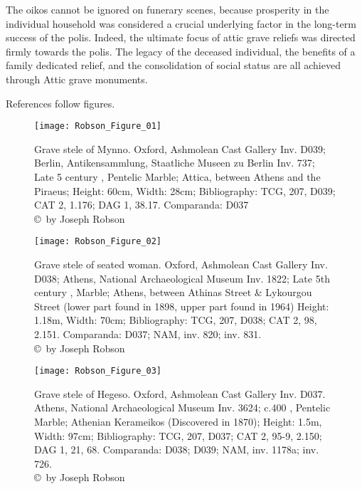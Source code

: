 The oikos cannot be ignored on funerary scenes, because prosperity in the individual household was considered a crucial underlying factor in the long-term success of the polis. Indeed, the ultimate focus of attic grave reliefs was directed firmly towards the polis. The legacy of the deceased individual, the benefits of a family dedicated relief, and the consolidation of social status are all achieved through Attic grave monuments.


\IJSRAseparator
\clearpage
{}

References follow figures.

\begin{figure}[!b]
	\texttt{[image: Robson\_Figure\_01]}

	\caption{Grave stele of Mynno. Oxford, Ashmolean Cast Gallery Inv. D039; Berlin, Antikensammlung, Staatliche Museen zu Berlin Inv. 737; Late 5 century \BC, Pentelic Marble; Attica, between Athens and the Piraeus; Height: 60cm, Width: 28cm; Bibliography: TCG, 207, D039; CAT 2, 1.176; DAG 1, 38.17. Comparanda: D037
		{\normalfont\scriptsize \\ \copyright\ by Joseph Robson}}
	\label{fig:Robson_Figure_01}
\end{figure}
\clearpage
\begin{figure}[!p]
	\texttt{[image: Robson\_Figure\_02]}

	\caption{Grave stele of seated woman. Oxford, Ashmolean Cast Gallery Inv. D038; Athens, National Archaeological Museum Inv. 1822; Late 5th century \BC, Marble; Athens, between Athinas Street \& Lykourgou Street (lower part found in 1898, upper part found in 1964)
		Height: 1.18m, Width: 70cm; Bibliography: TCG, 207, D038; CAT 2, 98, 2.151.
		Comparanda: D037; NAM, inv. 820; inv. 831.
		{\normalfont\scriptsize \\ \copyright\ by Joseph Robson}}
	\label{fig:Robson_Figure_02}
\end{figure}
\clearpage
\begin{figure}[!p]
	\texttt{[image: Robson\_Figure\_03]}

	\caption{Grave stele of Hegeso. Oxford, Ashmolean Cast Gallery Inv. D037. Athens, National Archaeological Museum Inv. 3624; c.400 \BC, Pentelic Marble; Athenian Kerameikos (Discovered in 1870); Height: 1.5m, Width: 97cm; Bibliography: TCG, 207, D037; CAT 2, 95-9, 2.150; DAG 1, 21, 68. Comparanda: D038; D039; NAM, inv. 1178a; inv. 726.
		{\normalfont\scriptsize \\ \copyright\ by Joseph Robson}}
	\label{fig:Robson_Figure_03}
\end{figure}
